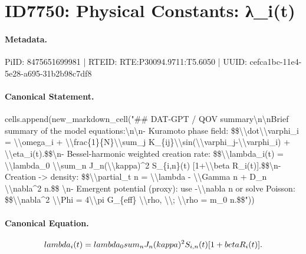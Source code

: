 \section*{ID7750: Physical Constants: λ\_i(t)}
\paragraph{Metadata.}
PiID: 8475651699981 | RTEID: RTE:P30094.9711:T5.6050 | UUID: cefca1bc-11e4-5e28-a695-31b2b98c7df8

\paragraph{Canonical Statement.}
cells.append(new\_markdown\_cell("\#\# DAT-GPT / QOV summary\textbackslash{}n\textbackslash{}nBrief summary of the model equations:\textbackslash{}n\textbackslash{}n- Kuramoto phase field: \$\$\textbackslash{}\textbackslash{}dot\textbackslash{}\textbackslash{}varphi\_i = \textbackslash{}\textbackslash{}omega\_i + \textbackslash{}\textbackslash{}frac\{1\}\{N\}\textbackslash{}\textbackslash{}sum\_j K\_\{ij\}\textbackslash{}\textbackslash{}sin(\textbackslash{}\textbackslash{}varphi\_j-\textbackslash{}\textbackslash{}varphi\_i) + \textbackslash{}\textbackslash{}eta\_i(t).\$\$\textbackslash{}n- Bessel-harmonic weighted creation rate: \$\$\textbackslash{}\textbackslash{}lambda\_i(t) = \textbackslash{}\textbackslash{}lambda\_0 \textbackslash{}\textbackslash{}sum\_n J\_n(\textbackslash{}\textbackslash{}kappa)\textasciicircum{}2 S\_\{i,n\}(t) [1+\textbackslash{}\textbackslash{}beta R\_i(t)].\$\$\textbackslash{}n- Creation -> density: \$\$\textbackslash{}\textbackslash{}partial\_t n = \textbackslash{}\textbackslash{}lambda - \textbackslash{}\textbackslash{}Gamma n + D\_n \textbackslash{}\textbackslash{}nabla\textasciicircum{}2 n.\$\$ \textbackslash{}n- Emergent potential (proxy): use -\textbackslash{}\textbackslash{}nabla n or solve Poisson: \$\$\textbackslash{}\textbackslash{}nabla\textasciicircum{}2 \textbackslash{}\textbackslash{}Phi = 4\textbackslash{}\textbackslash{}pi G\_\{eff\} \textbackslash{}\textbackslash{}rho, \textbackslash{}\textbackslash{}; \textbackslash{}\textbackslash{}rho = m\_0 n.\$\$"))

\paragraph{Canonical Equation.}
\[
\\lambda_i(t) = \\lambda_0 \\sum_n J_n(\\kappa)^2 S_{i,n}(t) [1+\\beta R_i(t)].
\]

